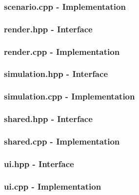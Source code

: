 {\subsubsection{scenario.cpp - Implementation}
\texttt{} 
\subsubsection{render.hpp - Interface}
\texttt{} 
\pagebreak
\subsubsection{render.cpp - Implementation}
\texttt{} 
\pagebreak
\subsubsection{simulation.hpp - Interface}
\texttt{} 
\pagebreak
\subsubsection{simulation.cpp - Implementation}
\texttt{} 
\pagebreak
\subsubsection{shared.hpp - Interface}
\texttt{} 
\pagebreak
\subsubsection{shared.cpp - Implementation}
\texttt{} 
\pagebreak
\subsubsection{ui.hpp - Interface}
\texttt{} 
\pagebreak
\subsubsection{ui.cpp - Implementation}
\texttt{} 
\begin{figure}

\end{figure}}
